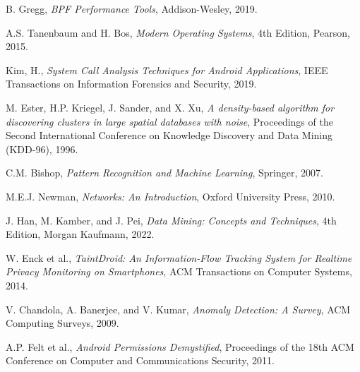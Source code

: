 \documentclass[a4paper,12pt]{report}
\begin{document}
\begin{thebibliography}{99}
B. Gregg, \textit{BPF Performance Tools}, Addison-Wesley, 2019.

A.S. Tanenbaum and H. Bos, \textit{Modern Operating Systems}, 4th Edition, Pearson, 2015.

Kim, H., \textit{System Call Analysis Techniques for Android Applications}, IEEE Transactions on Information Forensics and Security, 2019.

M. Ester, H.P. Kriegel, J. Sander, and X. Xu, \textit{A density-based algorithm for discovering clusters in large spatial databases with noise}, Proceedings of the Second International Conference on Knowledge Discovery and Data Mining (KDD-96), 1996.

C.M. Bishop, \textit{Pattern Recognition and Machine Learning}, Springer, 2007.

M.E.J. Newman, \textit{Networks: An Introduction}, Oxford University Press, 2010.

J. Han, M. Kamber, and J. Pei, \textit{Data Mining: Concepts and Techniques}, 4th Edition, Morgan Kaufmann, 2022.

W. Enck et al., \textit{TaintDroid: An Information-Flow Tracking System for Realtime Privacy Monitoring on Smartphones}, ACM Transactions on Computer Systems, 2014.

V. Chandola, A. Banerjee, and V. Kumar, \textit{Anomaly Detection: A Survey}, ACM Computing Surveys, 2009.

A.P. Felt et al., \textit{Android Permissions Demystified}, Proceedings of the 18th ACM Conference on Computer and Communications Security, 2011.


\end{thebibliography}
\end{document}
